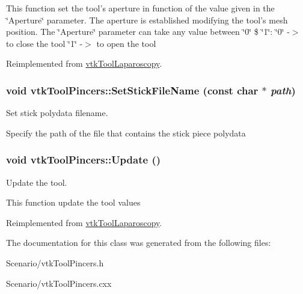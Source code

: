 This function set the tool's aperture in function of the value given in the \char`\"{}Aperture\char`\"{} parameter. The aperture is established modifying the tool's mesh position. The \char`\"{}Aperture\char`\"{} parameter can take any value between \char`\"{}0\char`\"{} \$ \char`\"{}1\char`\"{}: \char`\"{}0\char`\"{} -\/$>$ to close the tool \char`\"{}1\char`\"{} -\/$>$ to open the tool 

Reimplemented from \hyperlink{classvtkToolLaparoscopy_a870cb47bfdd67a9aecaba2fb7fbfa0ba}{vtkToolLaparoscopy}.

\hypertarget{classvtkToolPincers_a844db9dccd0034605ddd23de176ac9dc}{
\subsubsection[{SetStickFileName}]{\setlength{\rightskip}{0pt plus 5cm}void vtkToolPincers::SetStickFileName (const char $\ast$ {\em path})}}
\label{classvtkToolPincers_a844db9dccd0034605ddd23de176ac9dc}


Set stick polydata filename. 

Specify the path of the file that contains the stick piece polydata \hypertarget{classvtkToolPincers_a57986aee2bcfa04472410cd7bf5c7929}{
\subsubsection[{Update}]{\setlength{\rightskip}{0pt plus 5cm}void vtkToolPincers::Update ()}}
\label{classvtkToolPincers_a57986aee2bcfa04472410cd7bf5c7929}


Update the tool. 

This function update the tool values 

Reimplemented from \hyperlink{classvtkToolLaparoscopy_a4445a0cfabd77b50a06929b04cb71f9e}{vtkToolLaparoscopy}.



The documentation for this class was generated from the following files:\begin{DoxyCompactItemize}
\item 
Scenario/vtkToolPincers.h\item 
Scenario/vtkToolPincers.cxx\end{DoxyCompactItemize}
